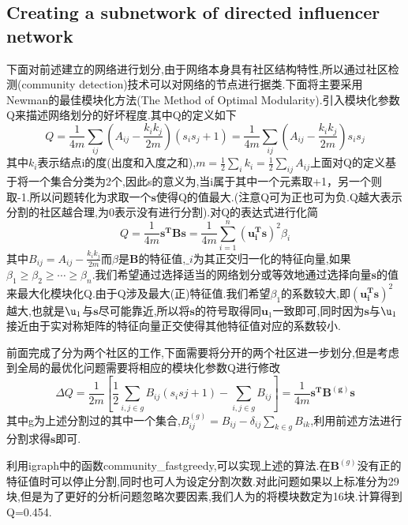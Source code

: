 \documentclass[a4paper,12pt]{article}
\begin{document}
\begin{spacing}{1.2}
		 \subsection{Creating a subnetwork of directed influencer network} 
		 下面对前述建立的网络进行划分,由于网络本身具有社区结构特性,所以通过社区检测(community detection)技术可以对网络的节点进行据类.下面将主要采用Newman的最佳模块化方法(The Method of Optimal Modularity).引入模块化参数Q来描述网络划分的好坏程度.其中Q的定义如下
		 $$
		 Q=\frac{1}{4m}\sum\limits_{ij}\left(A_{ij}-\frac{k_{i}k_{j}}{2m}\right)(s_{i}s_{j}+1)=\frac{1}{4m}\sum\limits_{ij}\left(A_{ij}-\frac{k_{i}k_{j}}{2m}\right)s_{i}s_{j}
		 $$
		 其中$k_{i}$表示结点i的度(出度和入度之和),$m=\frac{1}{2}\sum\limits_{i}k_{i}=\frac{1}{2}\sum\limits_{ij}A_{ij}$上面对Q的定义基于将一个集合分类为2个,因此s的意义为,当i属于其中一个元素取+1，另一个则取-1.所以问题转化为求取一个$\bm{s}$使得Q的值最大.(注意Q可为正也可为负.Q越大表示分割的社区越合理,为0表示没有进行分割).对Q的表达式进行化简
		 $$
		 Q=\frac{1}{4m}\bm{s^{T}}\bm{B}\bm{s}=\frac{1}{4m}\sum\limits^{n}_{i=1}(\bm{u_{i}^{T}}\bm{s})^{2}\beta_{i}
		 $$
		 其中$B_{ij}=A_{ij}-\frac{k_{i}k_{j}}{2m}$而$\beta$是$\bm{B}$的特征值,$\bm_{i}$为其正交归一化的特征向量,如果$\beta_{1}\geqslant\beta_{2}\geqslant\cdots\geqslant\beta_{n}$.我们希望通过选择适当的网络划分或等效地通过选择向量$\bm{s}$的值来最大化模块化Q.由于Q涉及最大(正)特征值.我们希望$\beta_{1}$的系数较大,即$(\bm{u_{i}^{T}}\bm{s})^{2}$越大,也就是$\u_{1}$与$\bm{s}$尽可能靠近,所以将$\bm{s}$的符号取得同$\bm{u}_{1}$一致即可,同时因为$\bm{s}$与$\u_{1}$接近由于实对称矩阵的特征向量正交使得其他特征值对应的系数较小.
		 \par
		 前面完成了分为两个社区的工作,下面需要将分开的两个社区进一步划分,但是考虑到全局的最优化问题需要将相应的模块化参数Q进行修改
		 $$
		 \Delta Q=\frac{1}{2m}\left[\frac{1}{2}\sum\limits_{i,j\in g} B_{ij}(s_{i}s{j}+1)-\sum\limits_{i,j\in g}B_{ij}\right]=\frac{1}{4m}\bm{s^{T}}\bm{B^{(g)}}\bm{s}
		 $$
		 其中g为上述分割过的其中一个集合,$B_{ij}^{(g)}=B_{ij}-\delta_{ij}\sum\limits_{k\in g}B_{ik}$,利用前述方法进行分割求得$\bm{s}$即可.
		 \par
		 利用igraph中的函数community\_fastgreedy,可以实现上述的算法.在$\bm{B}^{(g)}$没有正的特征值时可以停止分割,同时也可人为设定分割次数.对此问题如果以上标准分为29块,但是为了更好的分析问题忽略次要因素,我们人为的将模块数定为16块.计算得到Q=0.454.

\end{spacing}
\end{document}
